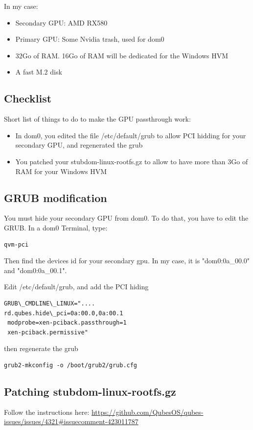 \documentclass[12pt]{article}
\begin{document}
In my case:
\begin{itemize}
  \item Secondary GPU: AMD RX580
  \item Primary GPU: Some Nvidia trash, used for dom0
  \item 32Go of RAM. 16Go of RAM will be dedicated for the Windows HVM
  \item A fast M.2 disk
\end{itemize}

\subsection{Checklist}
Short list of things to do to make the GPU passthrough work:
\begin{itemize}
\item In dom0, you edited the file /etc/default/grub to allow PCI hidding for your secondary GPU, and regenerated the grub
\item You patched your stubdom-linux-rootfs.gz to allow to have more than 3Go of RAM for your Windows HVM
\end{itemize}

\subsection{GRUB modification}
You must hide your secondary GPU from dom0.
To do that, you have to edit the GRUB.
In a dom0 Terminal, type:
\begin{verbatim}
qvm-pci
\end{verbatim}
Then find the devices id for your secondary gpu. In my case, it is "dom0:0a\_00.0" and "dom0:0a\_00.1".

Edit /etc/default/grub, and add the PCI hiding

\begin{verbatim}
GRUB\_CMDLINE\_LINUX=".... 
rd.qubes.hide\_pci=0a:00.0,0a:00.1 
 modprobe=xen-pciback.passthrough=1
 xen-pciback.permissive"
\end{verbatim}

then regenerate the grub
\begin{verbatim}
grub2-mkconfig -o /boot/grub2/grub.cfg
\end{verbatim}

\subsection{Patching stubdom-linux-rootfs.gz}
Follow the instructions here:
\href{https://github.com/QubesOS/qubes-issues/issues/4321\#issuecomment-423011787}{https://github.com/QubesOS/qubes-issues/issues/4321\#issuecomment-423011787}
\end{document}
